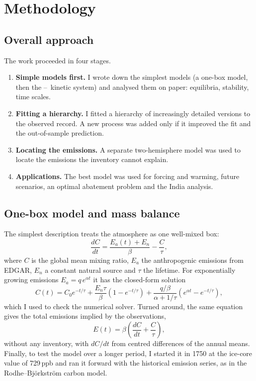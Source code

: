 \documentclass[11pt,a4paper]{article}
\newcommand{\CH}{\ce{CH4}}
\newcommand{\OH}{\ce{OH}}
\begin{document}
\section{Methodology}

\subsection{Overall approach}
The work proceeded in four stages.
\begin{enumerate}\itemsep0pt
\item \textbf{Simple models first.} I wrote down the simplest models (a one-box model, then the \CH--\OH\ kinetic system) and analysed them on paper: equilibria, stability, time scales.
\item \textbf{Fitting a hierarchy.} I fitted a hierarchy of increasingly detailed versions to the observed record. A new process was added only if it improved the fit and the out-of-sample prediction.
\item \textbf{Locating the emissions.} A separate two-hemisphere model was used to locate the emissions the inventory cannot explain.
\item \textbf{Applications.} The best model was used for forcing and warming, future scenarios, an optimal abatement problem and the India analysis.
\end{enumerate}


\subsection{One-box model and mass balance}
The simplest description treats the atmosphere as one well-mixed box:
\begin{equation}
\frac{dC}{dt}=\frac{E_a(t)+E_n}{\beta}-\frac{C}{\tau},
\label{eq:onebox}
\end{equation}
where $C$ is the global mean mixing ratio, $E_a$ the anthropogenic emissions from EDGAR, $E_n$ a constant natural source and $\tau$ the lifetime. For exponentially growing emissions $E_a=q\,e^{\alpha t}$ it has the closed-form solution
\begin{equation}
C(t)=C_0e^{-t/\tau}+\frac{E_n\tau}{\beta}\left(1-e^{-t/\tau}\right)+\frac{q/\beta}{\alpha+1/\tau}\left(e^{\alpha t}-e^{-t/\tau}\right),
\end{equation}
which I used to check the numerical solver. Turned around, the same equation gives the total emissions implied by the observations,
\begin{equation}
E(t)=\beta\left(\frac{dC}{dt}+\frac{C}{\tau}\right),
\label{eq:topdown}
\end{equation}
without any inventory, with $dC/dt$ from centred differences of the annual means. Finally, to test the model over a longer period, I started it in 1750 at the ice-core value of 729\,ppb and ran it forward with the historical emission series, as in the Rodhe--Bj\"orkstr\"om carbon model.
\end{document}

